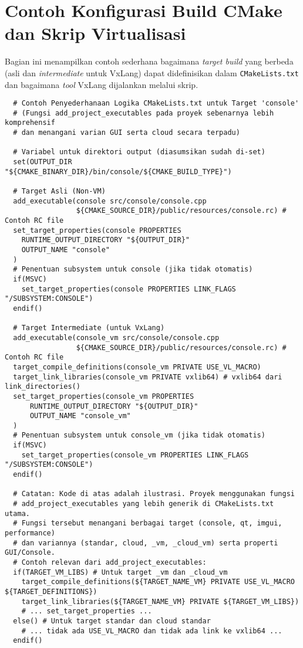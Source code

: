 \chapter*{Contoh Konfigurasi Build CMake dan Skrip Virtualisasi}
\label{app:config_build_vx_full} %

Bagian ini menampilkan contoh sederhana bagaimana \textit{target build} yang berbeda (asli dan \textit{intermediate} untuk VxLang) dapat didefinisikan dalam \texttt{CMakeLists.txt} dan bagaimana \textit{tool} VxLang dijalankan melalui skrip.

\begin{verbatim}
  # Contoh Penyederhanaan Logika CMakeLists.txt untuk Target 'console'
  # (Fungsi add_project_executables pada proyek sebenarnya lebih komprehensif
  # dan menangani varian GUI serta cloud secara terpadu)

  # Variabel untuk direktori output (diasumsikan sudah di-set)
  set(OUTPUT_DIR "${CMAKE_BINARY_DIR}/bin/console/${CMAKE_BUILD_TYPE}")

  # Target Asli (Non-VM)
  add_executable(console src/console/console.cpp 
                 ${CMAKE_SOURCE_DIR}/public/resources/console.rc) # Contoh RC file
  set_target_properties(console PROPERTIES 
    RUNTIME_OUTPUT_DIRECTORY "${OUTPUT_DIR}"
    OUTPUT_NAME "console"
  )
  # Penentuan subsystem untuk console (jika tidak otomatis)
  if(MSVC)
    set_target_properties(console PROPERTIES LINK_FLAGS "/SUBSYSTEM:CONSOLE")
  endif()

  # Target Intermediate (untuk VxLang)
  add_executable(console_vm src/console/console.cpp 
                 ${CMAKE_SOURCE_DIR}/public/resources/console.rc) # Contoh RC file
  target_compile_definitions(console_vm PRIVATE USE_VL_MACRO)
  target_link_libraries(console_vm PRIVATE vxlib64) # vxlib64 dari link_directories()
  set_target_properties(console_vm PROPERTIES
      RUNTIME_OUTPUT_DIRECTORY "${OUTPUT_DIR}"
      OUTPUT_NAME "console_vm"
  )
  # Penentuan subsystem untuk console_vm (jika tidak otomatis)
  if(MSVC)
    set_target_properties(console_vm PROPERTIES LINK_FLAGS "/SUBSYSTEM:CONSOLE")
  endif()
  
  # Catatan: Kode di atas adalah ilustrasi. Proyek menggunakan fungsi 
  # add_project_executables yang lebih generik di CMakeLists.txt utama.
  # Fungsi tersebut menangani berbagai target (console, qt, imgui, performance)
  # dan variannya (standar, cloud, _vm, _cloud_vm) serta properti GUI/Console.
  # Contoh relevan dari add_project_executables:
  if(TARGET_VM_LIBS) # Untuk target _vm dan _cloud_vm
    target_compile_definitions(${TARGET_NAME_VM} PRIVATE USE_VL_MACRO ${TARGET_DEFINITIONS})
    target_link_libraries(${TARGET_NAME_VM} PRIVATE ${TARGET_VM_LIBS})
    # ... set_target_properties ...
  else() # Untuk target standar dan cloud standar
    # ... tidak ada USE_VL_MACRO dan tidak ada link ke vxlib64 ...
  endif()
\end{verbatim}
\label{lst:cmake_vxlang_appendix_full}

